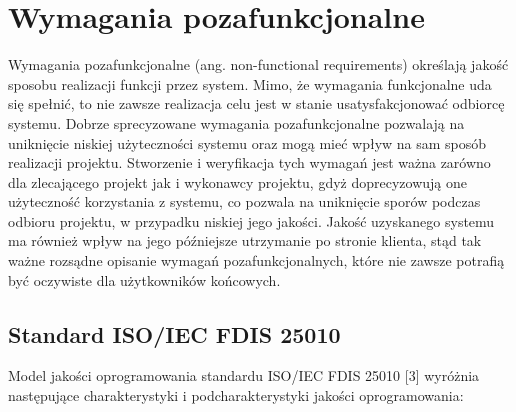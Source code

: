 \chapter{Wymagania pozafunkcjonalne}
\label{Chapter4}

Wymagania pozafunkcjonalne (ang. non-functional requirements) określają jakość sposobu realizacji funkcji przez system. Mimo, że wymagania funkcjonalne uda się spełnić, to nie zawsze realizacja celu jest w stanie usatysfakcjonować odbiorcę systemu. Dobrze sprecyzowane wymagania pozafunkcjonalne pozwalają na uniknięcie niskiej użyteczności systemu oraz mogą mieć wpływ na sam sposób realizacji projektu. Stworzenie i weryfikacja tych wymagań jest ważna zarówno dla zlecającego projekt jak i wykonawcy projektu, gdyż doprecyzowują one użyteczność korzystania z systemu, co pozwala na uniknięcie sporów podczas odbioru projektu, w przypadku niskiej jego jakości. Jakość uzyskanego systemu ma również wpływ na jego późniejsze utrzymanie po stronie klienta, stąd tak ważne rozsądne opisanie wymagań pozafunkcjonalnych, które nie zawsze potrafią być oczywiste dla użytkowników końcowych.

\section{Standard ISO/IEC FDIS 25010}

Model jakości oprogramowania standardu ISO/IEC FDIS 25010 [3] wyróżnia następujące charakterystyki i podcharakterystyki jakości oprogramowania:

